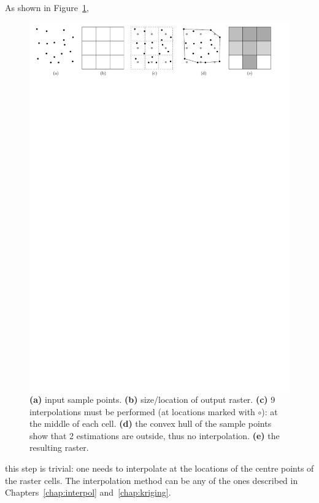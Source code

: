 As shown in Figure~\ref{fig:r-interpolation},
\begin{figure}[b]
  \centering
  \includegraphics[width=\linewidth]{figs/r-interpolation}
  \caption{\textbf{(a)} input sample points. \textbf{(b)} size/location of output raster. \textbf{(c)} 9 interpolations must be performed (at locations marked with $\circ$): at the middle of each cell. \textbf{(d)} the convex hull of the sample points show that 2 estimations are outside, thus no interpolation. \textbf{(e)} the resulting raster.}%
\label{fig:r-interpolation}
\end{figure}
this step is trivial: one needs to interpolate at the locations of the centre points of the raster cells.
The interpolation method can be any of the ones described in Chapters~\ref{chap:interpol} and~\ref{chap:kriging}.






